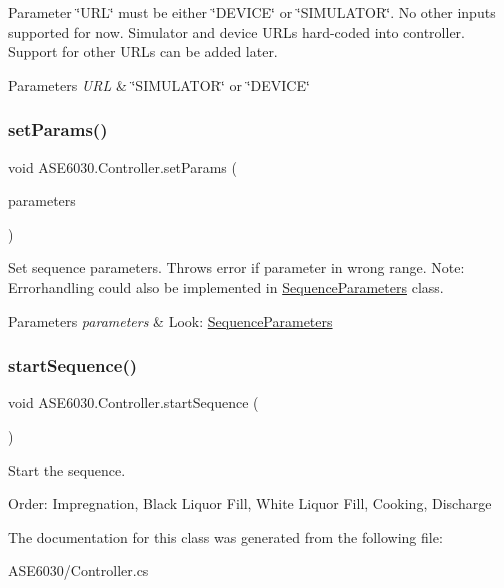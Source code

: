 Parameter \char`\"{}\+U\+R\+L\char`\"{} must be either \char`\"{}\+D\+E\+V\+I\+C\+E\char`\"{} or \char`\"{}\+S\+I\+M\+U\+L\+A\+T\+O\+R\char`\"{}. No other inputs supported for now. Simulator and device U\+R\+Ls hard-\/coded into controller. Support for other U\+R\+Ls can be added later. 
\begin{DoxyParams}{Parameters}
{\em U\+RL} & \char`\"{}\+S\+I\+M\+U\+L\+A\+T\+O\+R\char`\"{} or \char`\"{}\+D\+E\+V\+I\+C\+E\char`\"{}\\
\hline
\end{DoxyParams}
\mbox{\label{class_a_s_e6030_1_1_controller_afee09ba01da47aa772ce3da642e08e47}} 
\subsubsection{\texorpdfstring{set\+Params()}{setParams()}}
{\footnotesize\ttfamily void A\+S\+E6030.\+Controller.\+set\+Params (\begin{DoxyParamCaption}\item[{\hyperlink{class_a_s_e6030_1_1_sequence_parameters}{Sequence\+Parameters}}]{parameters }\end{DoxyParamCaption})\hspace{0.3cm}{\ttfamily [inline]}}

Set sequence parameters. Throws error if parameter in wrong range. Note\+: Errorhandling could also be implemented in \hyperlink{class_a_s_e6030_1_1_sequence_parameters}{Sequence\+Parameters} class. 
\begin{DoxyParams}{Parameters}
{\em parameters} & Look\+: \hyperlink{class_a_s_e6030_1_1_sequence_parameters}{Sequence\+Parameters} \\
\hline
\end{DoxyParams}
\mbox{\label{class_a_s_e6030_1_1_controller_afca76c3628ed37f21c1aac044a5e0441}} 
\subsubsection{\texorpdfstring{start\+Sequence()}{startSequence()}}
{\footnotesize\ttfamily void A\+S\+E6030.\+Controller.\+start\+Sequence (\begin{DoxyParamCaption}{ }\end{DoxyParamCaption})\hspace{0.3cm}{\ttfamily [inline]}}



Start the sequence. 

Order\+: Impregnation, Black Liquor Fill, White Liquor Fill, Cooking, Discharge 

The documentation for this class was generated from the following file\+:\begin{DoxyCompactItemize}
\item 
A\+S\+E6030/Controller.\+cs\end{DoxyCompactItemize}
